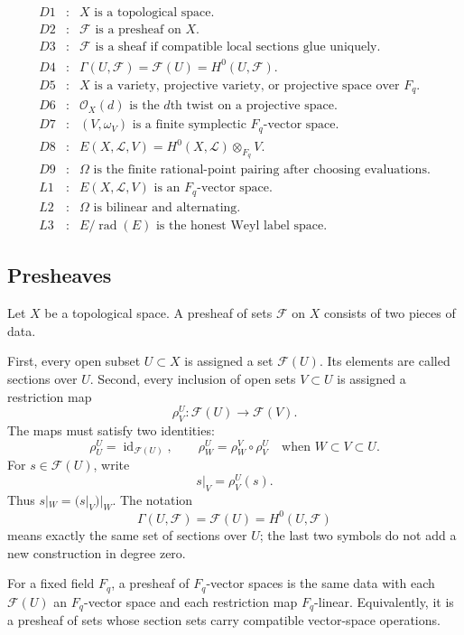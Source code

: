 \[
\begin{array}{rcl}
D1&:&X\text{ is a topological space.}\\
D2&:&\mathcal F\text{ is a presheaf on }X.\\
D3&:&\mathcal F\text{ is a sheaf if compatible local sections glue uniquely.}\\
D4&:&\Gamma(U,\mathcal F)=\mathcal F(U)=H^0(U,\mathcal F).\\
D5&:&X\text{ is a variety, projective variety, or projective space over }F_q.\\
D6&:&\mathcal O_X(d)\text{ is the }d\text{th twist on a projective space.}\\
D7&:&(V,\omega_V)\text{ is a finite symplectic }F_q\text{-vector space.}\\
D8&:&E(X,\mathcal L,V)=H^0(X,\mathcal L)\otimes_{F_q}V.\\
D9&:&\Omega\text{ is the finite rational-point pairing after choosing evaluations.}\\
L1&:&E(X,\mathcal L,V)\text{ is an }F_q\text{-vector space.}\\
L2&:&\Omega\text{ is bilinear and alternating.}\\
L3&:&E/\operatorname{rad}(E)\text{ is the honest Weyl label space.}
\end{array}
\]

\subsection{Presheaves}

Let \(X\) be a topological space.  A presheaf of sets \(\mathcal F\) on \(X\)
consists of two pieces of data.

First, every open subset \(U\subset X\) is assigned a set \(\mathcal F(U)\).
Its elements are called sections over \(U\).  Second, every inclusion of open
sets \(V\subset U\) is assigned a restriction map
\[
  \rho^U_V:\mathcal F(U)\longrightarrow \mathcal F(V).
\]
The maps must satisfy two identities:
\[
  \rho^U_U=\operatorname{id}_{\mathcal F(U)},\qquad
  \rho^U_W=\rho^V_W\circ\rho^U_V
  \quad\text{when } W\subset V\subset U.
\]
For \(s\in\mathcal F(U)\), write
\[
  s|_V=\rho^U_V(s).
\]
Thus \(s|_W=(s|_V)|_W\).  The notation
\[
  \Gamma(U,\mathcal F)=\mathcal F(U)=H^0(U,\mathcal F)
\]
means exactly the same set of sections over \(U\); the last two symbols do
not add a new construction in degree zero.

For a fixed field \(F_q\), a presheaf of \(F_q\)-vector spaces is the same
data with each \(\mathcal F(U)\) an \(F_q\)-vector space and each restriction
map \(F_q\)-linear.  Equivalently, it is a presheaf of sets whose section sets
carry compatible vector-space operations.

